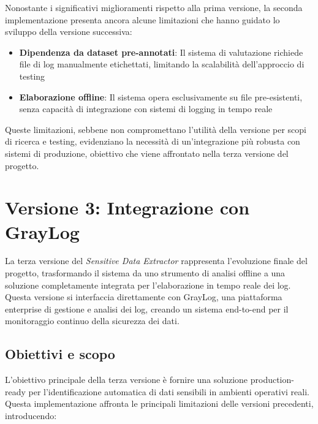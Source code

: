 \documentclass[12pt]{report}
\begin{document}
Nonostante i significativi miglioramenti rispetto alla prima versione, la seconda implementazione presenta ancora alcune limitazioni che hanno guidato lo sviluppo della versione successiva:

\begin{itemize}
    \item \textbf{Dipendenza da dataset pre-annotati}: Il sistema di valutazione richiede file di log manualmente etichettati, limitando la scalabilità dell'approccio di testing
    \item \textbf{Elaborazione offline}: Il sistema opera esclusivamente su file pre-esistenti, senza capacità di integrazione con sistemi di logging in tempo reale
\end{itemize}

Queste limitazioni, sebbene non compromettano l'utilità della versione per scopi di ricerca e testing, evidenziano la necessità di un'integrazione più robusta con sistemi di produzione, obiettivo che viene affrontato nella terza versione del progetto.

\section{Versione 3: Integrazione con GrayLog}
\label{sec:ver3}

La terza versione del \textit{Sensitive Data Extractor} rappresenta l'evoluzione finale del progetto, trasformando il sistema da uno strumento di analisi offline a una soluzione completamente integrata per l'elaborazione in tempo reale dei log. \\
Questa versione si interfaccia direttamente con GrayLog, una piattaforma enterprise di gestione e analisi dei log, creando un sistema end-to-end per il monitoraggio continuo della sicurezza dei dati.

\subsection{Obiettivi e scopo}
\label{subsec:ver3_obiettivi}

L'obiettivo principale della terza versione è fornire una soluzione production-ready per l'identificazione automatica di dati sensibili in ambienti operativi reali. Questa implementazione affronta le principali limitazioni delle versioni precedenti, introducendo:
\end{document}
